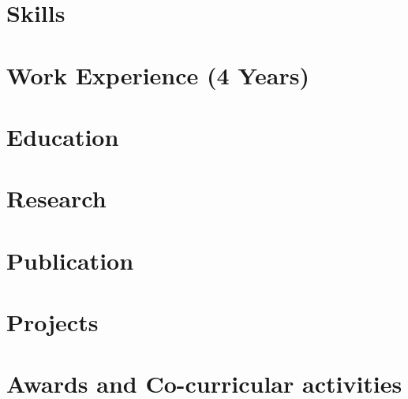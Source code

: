 \documentclass[letter,10pt]{article}
\begin{document}


\section{Skills}


\section{Work Experience  \normalsize{\textbf{\textsf{(4 Years)}}}}


\section{Education}


\section{Research}


\section{Publication}


\section{Projects}


\section{Awards and Co-curricular activities}


% 



% 
\end{document}
